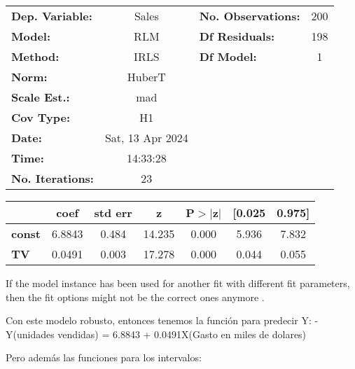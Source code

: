 \documentclass[11pt]{article}
\begin{document}
    \begin{center}
\begin{tabular}{lclc}
\toprule
\textbf{Dep. Variable:}  &      Sales       & \textbf{  No. Observations:  } &      200    \\
\textbf{Model:}          &       RLM        & \textbf{  Df Residuals:      } &      198    \\
\textbf{Method:}         &       IRLS       & \textbf{  Df Model:          } &        1    \\
\textbf{Norm:}           &      HuberT      & \textbf{                     } &             \\
\textbf{Scale Est.:}     &       mad        & \textbf{                     } &             \\
\textbf{Cov Type:}       &        H1        & \textbf{                     } &             \\
\textbf{Date:}           & Sat, 13 Apr 2024 & \textbf{                     } &             \\
\textbf{Time:}           &     14:33:28     & \textbf{                     } &             \\
\textbf{No. Iterations:} &        23        & \textbf{                     } &             \\
\bottomrule
\end{tabular}
\begin{tabular}{lcccccc}
               & \textbf{coef} & \textbf{std err} & \textbf{z} & \textbf{P$> |$z$|$} & \textbf{[0.025} & \textbf{0.975]}  \\
\midrule
\textbf{const} &       6.8843  &        0.484     &    14.235  &         0.000        &        5.936    &        7.832     \\
\textbf{TV}    &       0.0491  &        0.003     &    17.278  &         0.000        &        0.044    &        0.055     \\
\bottomrule
\end{tabular}
\end{center}

If the model instance has been used for another fit with different fit parameters, then the fit options might not be the correct ones anymore .

    

    Con este modelo robusto, entonces tenemos la función para predecir Y: -
Y(unidades vendidas) = 6.8843 + 0.0491X(Gasto en miles de dolares)

Pero además las funciones para los intervalos:
\end{document}
